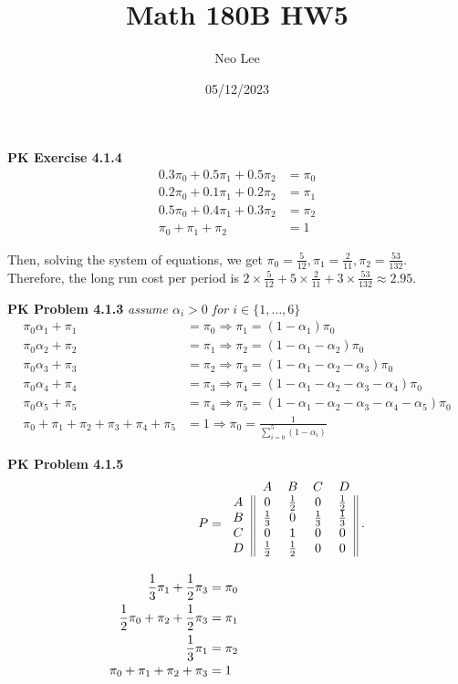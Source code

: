 \documentclass{article}
\title{Math 180B HW5}
\author{Neo Lee}
\date{05/12/2023}
\begin{document}
 

\maketitle 

\textbf{PK Exercise 4.1.4}
\begin{align*}
    0.3\pi_0 + 0.5\pi_1 + 0.5\pi_2 & = \pi_0 \\
    0.2\pi_0 + 0.1\pi_1 + 0.2\pi_2 & = \pi_1 \\
    0.5\pi_0 + 0.4\pi_1 + 0.3\pi_2 & = \pi_2 \\
    \pi_0 + \pi_1 + \pi_2 & = 1
\end{align*}

Then, solving the system of equations, we get $\pi_0 = \frac{5}{12}, \pi_1 = \frac{2}{11}, \pi_2 = \frac{53}{132}$.
Therefore, the long run cost per period is $2\times \frac{5}{12} + 5\times \frac{2}{11} + 3\times \frac{53}{132} \approx 2.95.$
\bigbreak

\textbf{PK Problem 4.1.3} \emph{assume $\alpha_i > 0$ for $i \in \{1,\dots, 6\}$}
\begin{align*}
    \pi_0\alpha_1 + \pi_1 & = \pi_0 \Rightarrow \pi_1 = (1-\alpha_1)\pi_0 \\
    \pi_0\alpha_2 + \pi_2 & = \pi_1 \Rightarrow \pi_2 = (1-\alpha_1-\alpha_2)\pi_0 \\
    \pi_0\alpha_3 + \pi_3 & = \pi_2 \Rightarrow \pi_3 = (1-\alpha_1-\alpha_2-\alpha_3)\pi_0 \\
    \pi_0\alpha_4 + \pi_4 & = \pi_3 \Rightarrow \pi_4 = (1-\alpha_1-\alpha_2-\alpha_3-\alpha_4)\pi_0 \\
    \pi_0\alpha_5 + \pi_5 & = \pi_4 \Rightarrow \pi_5 = (1-\alpha_1-\alpha_2-\alpha_3-\alpha_4-\alpha_5)\pi_0 \\
    \pi_0 + \pi_1 + \pi_2 + \pi_3 + \pi_4 + \pi_5 & = 1 \Rightarrow \pi_0 = \frac{1}{\sum_{i=0}^5 (1-\alpha_i)}
\end{align*}
\bigbreak

\textbf{PK Problem 4.1.5}
\begin{align*}
    P & = 
    \begin{blockarray}{ccccc}
        & A & B & C & D  \\
        \begin{block}{c||cccc||}
            A & 0 & \frac{1}{2} & 0 & \frac{1}{2} \\
            B & \frac{1}{3} & 0 & \frac{1}{3} & \frac{1}{3} \\
            C & 0 & 1 & 0 & 0 \\
            D & \frac{1}{2} & \frac{1}{2} & 0 & 0 \\
        \end{block}
    \end{blockarray}\; . \nonumber \\
    \frac{1}{3}\pi_1 + \frac{1}{2}\pi_3 & = \pi_0 \\
    \frac{1}{2}\pi_0 + \pi_2 + \frac{1}{2}\pi_3 & = \pi_1 \\
    \frac{1}{3}\pi_1 & = \pi_2 \\
    \pi_0 + \pi_1 + \pi_2 + \pi_3 & = 1
\end{align*} 
\end{document}
